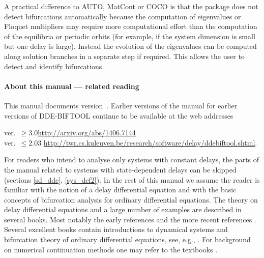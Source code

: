 \documentclass[10pt]{scrartcl}
\newcommand{\DDEBIFCODE}{\textsc{DDE-BIFTOOL}}
\newcommand{\ddebifweb}{\url{https://sourceforge.net/projects/ddebiftool}}
\newcommand{\ddebifarx}{\url{http://arxiv.org/abs/1406.7144}}
\newcommand{\ddebifwebold}{\url{http://twr.cs.kuleuven.be/research/software/delay/ddebiftool.shtml}}
\begin{document}
A practical difference to AUTO, MatCont or \textsc{COCO} is that the package
does not detect bifurcations automatically because the computation of
eigenvalues or Floquet multipliers may require more computational
effort than the computation of the equilibria or periodic orbits (for
example, if the system dimension is small but one delay is
large). Instead the evolution of the eigenvalues can be computed along
solution branches in a separate step if required. This allows the user
to detect and identify bifurcations.



\paragraph{About this manual --- related reading}
This manual documents version~\version. Earlier versions of the manual
for earlier versions of \DDEBIFCODE{} continue to be available at the
web addresses
\begin{tabbing}
  ver.~$\geq3.0$\qquad \= \ddebifarx{}\\
  ver.~$\leq2.03$ \> \ddebifwebold{}.
\end{tabbing}
For readers who intend to analyse only systems with constant delays,
the parts of the manual related to systems with state-dependent delays
can be skipped (sections \ref{sd_dde}, \ref{sys_def2}).  In the rest
of this manual we assume the reader is familiar with the notion of a
delay differential equation and with the basic concepts of bifurcation
analysis for ordinary differential equations.  The theory on delay
differential equations and a large number of examples are described in
several books. Most notably the early references
\cite{Bell63,Driv77,El's73,Hale77a,Kolm86} and the more recent
references \cite{Azbe91,Kolm92,Hale93,Diek95,Kolm99}.  Several
excellent books contain introductions to dynamical systems and
bifurcation theory of ordinary differential equations, see, e.g.,
\cite{Argy94,Chow82,Guck83,Kuzn04,Seyd94}. For background on numerical
continuation methods one may refer to the textbooks
\cite{DS13,Doed07,G00}.
\end{document}
